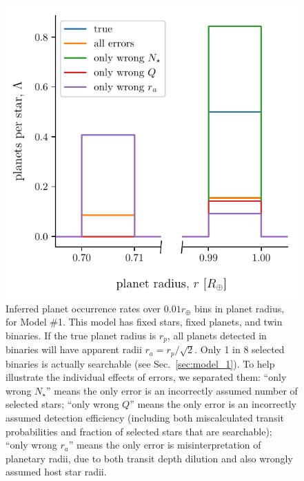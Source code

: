 \begin{figure}
    \begin{center}
        \includegraphics[width=\textwidth]{figures/errcases_rate_density_vs_radius_model_1_brokenx.pdf}
    \end{center}
    \caption{
    Inferred planet occurrence rates over $0.01r_\oplus$ bins in planet radius,
    for Model \#1.
    This model has fixed stars, fixed planets, and twin binaries.
    If the true planet radius is $r_p$, all planets 
    detected in binaries will have apparent radii $r_a = r_p/\sqrt{2}$.
    Only 1 in 8 selected binaries is actually searchable (see 
    Sec.~\ref{sec:model_1}).
    To help illustrate the individual effects of errors, we 
    separated them:
    ``only wrong $N_\star$'' means the only error is an incorrectly assumed 
    number of selected stars;
    ``only wrong $Q$'' means the only error is an incorrectly assumed 
    detection efficiency (including both miscalculated transit probabilities 
    and 
    fraction of selected stars that are searchable);
    ``only wrong $r_a$'' means the only error is misinterpretation of 
    planetary radii, due to both transit depth dilution and also wrongly 
    assumed host star radii.
    }
    \label{fig:errcases_model_1}
\end{figure}

